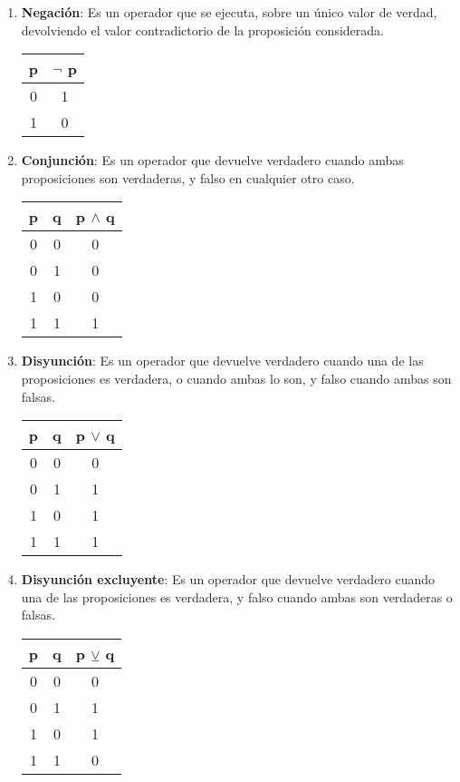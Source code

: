 \documentclass[a4paper, twoside]{article}
\begin{document}
\begin{enumerate}
	\item \textbf{Negación}: Es un operador que se ejecuta, sobre un único valor de verdad, devolviendo el valor contradictorio de la proposición considerada.
		\begin{center}
			\begin{tabular}{|c|c|}
			\hline
			\textbf{p} & $\lnot$ \textbf{p} \\
			\cline{0 - 1}
			\hline
			0 & 1 \\
			1 & 0 \\
			\hline
			\end{tabular}
		\end{center}
	
	\item \textbf{Conjunción}: Es un operador que devuelve verdadero cuando ambas proposiciones son verdaderas, y falso en cualquier otro caso.
		\begin{center}
			\begin{tabular}{|c|c|c|}
			\hline
			\textbf{p} & \textbf{q} & \textbf{p} $\wedge$ \textbf{q}\\
			\cline{0 - 1}
			\hline
			0 & 0  & 0\\
			0 & 1  & 0\\
			1 & 0  & 0\\
			1 & 1  & 1\\
			\hline
			\end{tabular}
		\end{center}
	
	\item \textbf{Disyunción}: Es un operador que devuelve verdadero cuando una de las proposiciones es verdadera, o cuando ambas lo son, y falso cuando ambas son falsas.
		\begin{center}
			\begin{tabular}{|c|c|c|}
			\hline
			\textbf{p} & \textbf{q} & \textbf{p} $\lor$ \textbf{q}\\
			\cline{0 - 1}
			\hline
			0 & 0  & 0\\
			0 & 1  & 1\\
			1 & 0  & 1\\
			1 & 1  & 1\\
			\hline
			\end{tabular}
		\end{center}
	
	\item \textbf{Disyunción excluyente}: Es un operador que devuelve verdadero cuando una de las proposiciones es verdadera, y falso cuando ambas son verdaderas o falsas.
		\begin{center}
			\begin{tabular}{|c|c|c|}
			\hline
			\textbf{p} & \textbf{q} & \textbf{p} $\veebar$ \textbf{q}\\
			\cline{0 - 1}
			\hline
			0 & 0  & 0\\
			0 & 1  & 1\\
			1 & 0  & 1\\
			1 & 1  & 0\\
			\hline
			\end{tabular}
		\end{center}
	

\end{enumerate}
\end{document}
